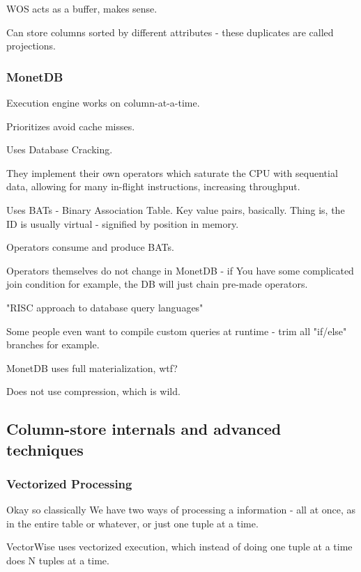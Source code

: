 \documentclass{article}
\begin{document}
			WOS acts as a buffer, makes sense.
			
			Can store columns sorted by different attributes - these duplicates are called projections.
			
		\subsubsection{MonetDB}
		
			Execution engine works on column-at-a-time.
			
			Prioritizes avoid cache misses.
			
			Uses Database Cracking.
			
			They implement their own operators which saturate the CPU with sequential data, allowing for many in-flight instructions, increasing throughput.
			
			Uses BATs - Binary Association Table. Key value pairs, basically. Thing is, the ID is usually virtual - signified by position in memory.
			
			Operators consume and produce BATs.
			
			Operators themselves do not change in MonetDB - if You have some complicated join condition for example, the DB will just chain pre-made operators.
			
			"RISC approach to database query languages"
			
			Some people even want to compile custom queries at runtime - trim all "if/else" branches for example.
			
			MonetDB uses full materialization, wtf?
			
			Does not use compression, which is wild.
			
	\subsection{Column-store internals and advanced techniques}
	
		\subsubsection{Vectorized Processing}
		
			Okay so classically We have two ways of processing a information - all at once, as in the entire table or whatever, or just one tuple at a time.
			
			VectorWise uses vectorized execution, which instead of doing one tuple at a time does N tuples at a time.
			
\end{document}
